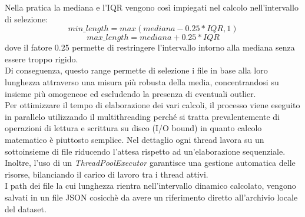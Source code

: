 \documentclass{article}
\begin{document}
Nella pratica la mediana e l'IQR vengono così impiegati nel calcolo nell'intervallo di selezione:
\begin{equation}
    min\_length =max(mediana-0.25*IQR,1)
\end{equation}
\begin{equation}
    max\_length =mediana+0.25*IQR
\end{equation}
dove il fatore 0.25 permette di restringere l'intervallo intorno alla mediana senza essere troppo rigido.\\
Di conseguenza, questo range permette di selezione i file in base alla loro lunghezza attraverso una misura più robusta della media, concentrandosi su insieme più omogeneoe ed escludendo la presenza di eventuali outlier.\\
Per ottimizzare il tempo di elaborazione dei vari calcoli, il processo viene eseguito in parallelo utilizzando il multithreading perché si tratta prevalentemente di operazioni di lettura e scrittura su disco (I/O bound) in quanto calcolo matematico è piuttosto semplice. Nel dettaglio ogni thread lavora su un sottoinsieme di file riducendo l'attesa rispetto ad un'elaborazione sequenziale. Inoltre, l'uso di un \textit{ThreadPoolExecutor}\cite{python-concurrent-futures} garantisce una gestione automatica delle risorse, bilanciando il carico di lavoro tra i thread attivi.\\
I path dei file la cui lunghezza rientra nell'intervallo dinamico calcolato, vengono salvati in un file JSON cosicchè da avere un riferimento diretto all'archivio locale del dataset.
\end{document}
